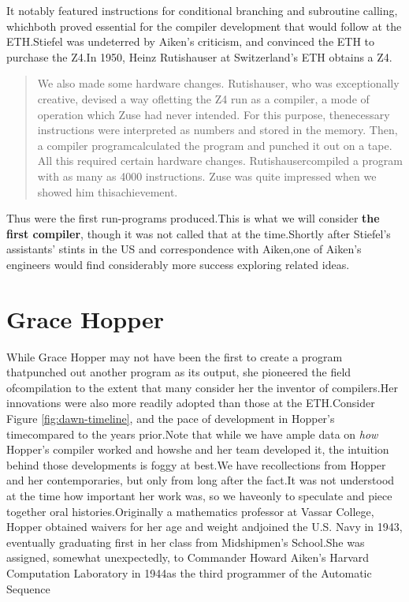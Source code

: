 It notably featured instructions for conditional branching and subroutine 
calling, whichboth proved essential for the compiler development that would 
follow at the ETH.Stiefel was undeterred by Aiken's criticism, and convinced 
the ETH to purchase the Z4.In 1950, Heinz Rutishauser at Switzerland's ETH 
obtains a Z4.
\begin{quotation}
    We also made some hardware changes. Rutishauser, who was exceptionally 
creative, devised a way ofletting the Z4 run as a compiler, a mode of operation 
which Zuse had never intended. For this purpose, thenecessary instructions were 
interpreted as numbers and stored in the memory. Then, a compiler 
programcalculated the program and punched it out on a tape. All this required 
certain hardware changes. Rutishausercompiled a program with as many as 4000 
instructions. Zuse was quite impressed when we showed him thisachievement.
    \cite{konrad-zuses-z4-2000}
\end{quotation}
Thus were the first run-programs produced.This is what we will consider \textbf{the first compiler}, though it was not called that at the time.Shortly after Stiefel's assistants' stints in the US and correspondence with Aiken,one of Aiken's engineers would find considerably more success exploring related ideas.\section{Grace Hopper}While Grace Hopper may not have been the first to create a program thatpunched
out another program as its output, she pioneered the field ofcompilation to the
extent that many consider her the inventor of compilers.Her innovations were
also more readily adopted than those at the ETH.Consider Figure
\ref{fig:dawn-timeline}, and the pace of development in Hopper's timecompared
to the years prior.Note that while we have ample data on \textit{how} Hopper's
compiler worked and howshe and her team developed it, the intuition behind
those developments is foggy at best.We have recollections from Hopper and her
contemporaries, but only from long after the fact.It was not understood at the
time how important her work was, so we haveonly to speculate and piece together
oral histories.Originally a mathematics professor at Vassar College, Hopper
obtained waivers for her age and weight andjoined the U.S. Navy in 1943,
eventually graduating first in her class from Midshipmen's School.She was
assigned, somewhat unexpectedly, to Commander Howard Aiken's Harvard
Computation Laboratory in 1944as the third programmer of the Automatic Sequence
